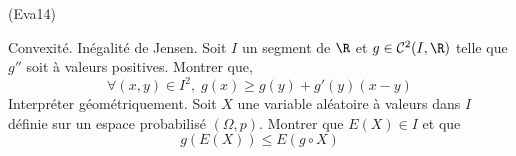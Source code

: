 \begin{tiny}(Eva14)\end{tiny} Convexité. Inégalité de Jensen.\newline
Soit $I$ un segment de $\R$ et $g\in\mathcal{C}^2(I,\R)$ telle que $g''$ soit à valeurs positives. Montrer que,
\begin{displaymath}
 \forall (x,y)\in I^2,\;
g(x)\geq g(y)+g'(y)(x-y)
\end{displaymath}
Interpréter géométriquement.\newline
Soit $X$ une variable aléatoire à valeurs dans $I$ définie sur un espace probabilisé $(\Omega,p)$. Montrer que $E( X)\in I$ et que 
\begin{displaymath}
 g(E(X)) \leq E(g\circ X)
\end{displaymath}
 
